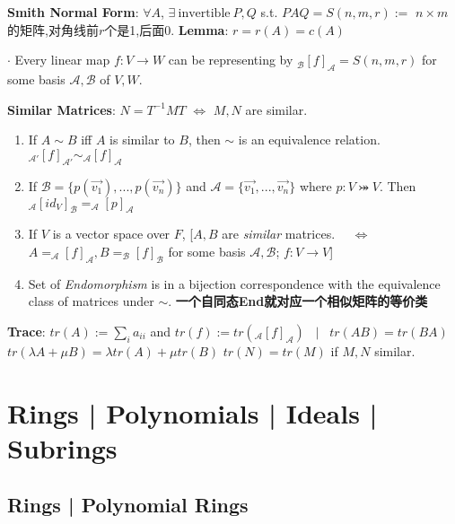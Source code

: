\documentclass[9pt]{article}
\begin{document}
\textbf{Smith Normal Form}: {\small $\forall A$, $\exists \ \text{invertible} \ P,Q$ s.t. $PAQ=S(n,m,r):=$ {\footnotesize $n\times m$的矩阵,对角线前$r$个是1,后面0}. \quad \textbf{Lemma}: $r=r(A)=c(A)$}

$\cdot$ Every linear map $f:V\to W$ can be representing by $_{\mathcal{B}}[f]_{\mathcal{A}}=S(n,m,r)$ for some basis $\mathcal{A},\mathcal{B}$ of $V,W$.

\textbf{Similar Matrices}: $N=T^{-1}MT$ $\Leftrightarrow$ $M,N$ are similar. 

\begin{enumerate}[itemsep=-2pt, topsep=-2pt]
    \item If $A\sim B$ iff $A$ is similar to $B$, then $\sim$ is an equivalence relation. \quad \quad $_{\mathcal{A}'}[f]_{\mathcal{A'}}\sim_{\mathcal{A}}[f]_{\mathcal{A}}$
    \item If $\mathcal{B}=\{p(\vec{v_1}),...,p(\vec{v_n})\}$ and $\mathcal{A}=\{\vec{v_1},...,\vec{v_n}\}$ where $p:V\bij V$. Then $_{\mathcal{A}}[id_V]_{\mathcal{B}}=_{\mathcal{A}}[p]_{\mathcal{A}}$
    \item If $V$ is a vector space over $F$, [$A,B$ are \textit{similar} matrices. \ \ $\Leftrightarrow$ \ \ $A=_{\mathcal{A}}[f]_{\mathcal{A}},B=_{\mathcal{B}}[f]_{\mathcal{B}}$ for some basis $\mathcal{A},\mathcal{B}$; $f:V\to V$]
    \item {\small Set of \textit{Endomorphism} is in a bijection correspondence with the equivalence class of matrices under $\sim$. } {\scriptsize \textbf{一个自同态End就对应一个相似矩阵的等价类}}
\end{enumerate}

\textbf{Trace}: $tr(A):=\sum_{i}a_{ii}$ and $tr(f):=tr(_{\mathcal{A}}[f]_{\mathcal{A}})$ \ $\big|$ \ {\small $tr(AB)=tr(BA)$ \quad $tr(\lambda A+\mu B)=\lambda tr(A)+\mu tr(B)$ \quad $tr(N)=tr(M)$ if $M,N$ similar.}


\section{Rings | Polynomials | Ideals | Subrings} %

\subsection{Rings | Polynomial Rings} %
\end{document}
